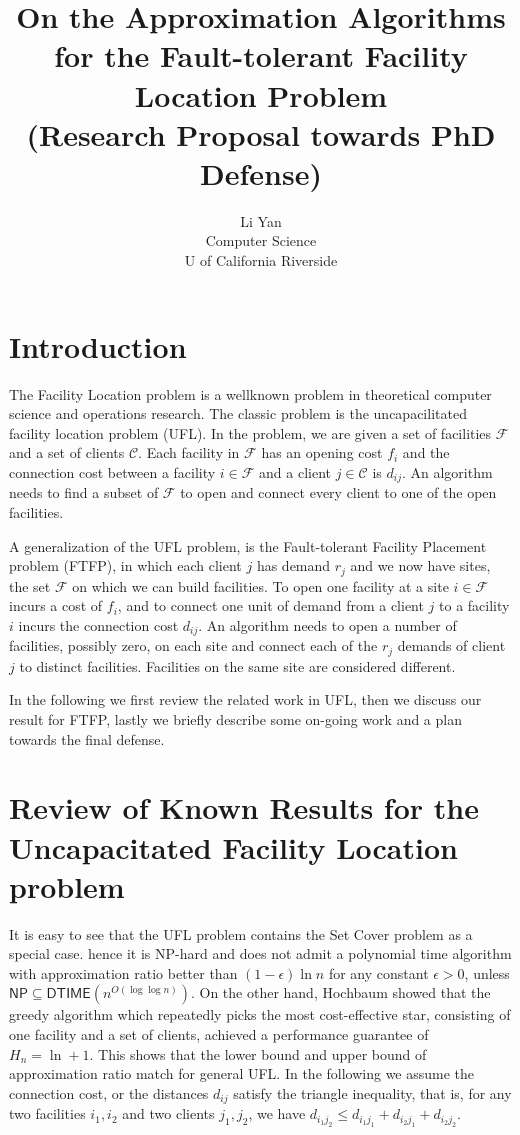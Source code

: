 \documentclass{article}
\title{On the Approximation Algorithms for the Fault-tolerant Facility Location Problem\\(Research Proposal towards PhD Defense)}
\author{Li Yan\\Computer Science\\U of California Riverside}
\newcommand{\fac}{\mathcal{F}}
\newcommand{\cli}{\mathcal{C}}
\newcommand{\NP}{\textsf{NP}}
\newcommand{\DTIME}{\textsf{DTIME}}
\begin{document}
\maketitle

\section{Introduction}
The Facility Location problem is a wellknown problem in theoretical
computer science and operations research. The classic problem is the
uncapacilitated facility location problem (UFL). In the problem, we
are given a set of facilities $\fac$ and a set of clients $\cli$. Each
facility in $\fac$ has an opening cost $f_i$ and the connection cost
between a facility $i\in \fac$ and a client $j\in \cli$ is
$d_{ij}$. An algorithm needs to find a subset of $\fac$ to open and
connect every client to one of the open facilities.

A generalization of the UFL problem, is the Fault-tolerant Facility
Placement problem (FTFP), in which each client $j$ has demand $r_j$
and we now have sites, the set $\fac$ on which we can build
facilities. To open one facility at a site $i\in \fac$ incurs a cost
of $f_i$, and to connect one unit of demand from a client $j$ to a
facility $i$ incurs the connection cost $d_{ij}$. An algorithm needs
to open a number of facilities, possibly zero, on each site and
connect each of the $r_j$ demands of client $j$ to distinct
facilities. Facilities on the same site are considered different.

In the following we first review the related work in UFL, then we
discuss our result for FTFP, lastly we briefly describe some on-going
work and a plan towards the final defense.

\section{Review of Known Results for the Uncapacitated Facility
  Location problem}
It is easy to see that the UFL problem contains the Set Cover problem
as a special case. hence it is NP-hard and does not admit a polynomial
time algorithm with approximation ratio better than $(1-\epsilon)\ln
n$ for any constant $\epsilon >0$, unless $\NP \subseteq
\DTIME(n^{O(\log\log n)})$. On the other hand, Hochbaum showed that
the greedy algorithm which repeatedly picks the most cost-effective
star, consisting of one facility and a set of clients, achieved a
performance guarantee of $H_n = \ln + 1$. This shows that the lower
bound and upper bound of approximation ratio match for general UFL. In
the following we assume the connection cost, or the distances $d_{ij}$
satisfy the triangle inequality, that is, for any two facilities $i_1,
i_2$ and two clients $j_1, j_2$, we have $d_{i_1 j_2} \leq d_{i_1 j_1}
+ d_{i_2 j_1} + d_{i_2 j_2}$.
\end{document}
